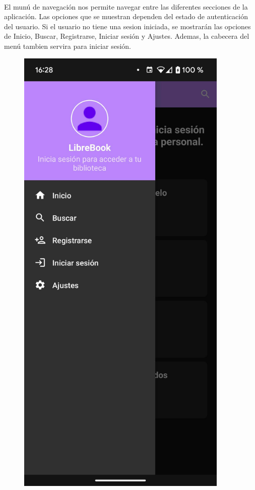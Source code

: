 \documentclass[a4paper,12pt]{report}
\begin{document}
      \begin{minipage}{0.6\textwidth}
        \paragraph*{}{
          El munú de navegación nos permite navegar entre las diferentes secciones de la aplicación. Las opciones que se muestran dependen del estado de autenticación del usuario. Si el usuario no tiene una sesion iniciada, se mostrarán las opciones de Inicio, Buscar, Registrarse, Iniciar sesión y Ajustes. Ademas, la cabecera del menú tambien servira para iniciar sesión.
        }
      \end{minipage}
      \hfill
      \begin{minipage}{0.27\textwidth}
        \begin{figure}[H]
          \centering
          \includegraphics[width=0.9\textwidth]{.img/menu.png}

\end{figure}
\end{minipage}
\end{document}
